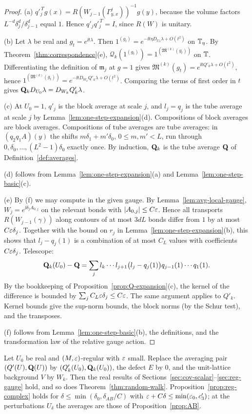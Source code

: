 \begin{proof}
(a) $q'^{\,T}_jg(x)=R(W_{j-1}(\Gamma^j_{y,x}))^{-1}g(y)$, because the volume factors $L^{-d}\delta_j^d/\delta_{j-1}^d$ equal $1$. Hence $q'_jq'^{\,T}_j=I$, since $R(W)$ is unitary.

(b) Let $\lambda$ be real and $g_t=e^{\ii t\lambda}$. Then $1^{(g_t)}=e^{-\ii t\eta D_{U_0}\lambda+O(t^2)}$ on $\mathbb T_\eta$. By Theorem~\ref{thm:correspondence}(e), $\mathcal Q_k(1^{(g_t)})=1^{(\mathfrak M^{(k)}(g_t))}$ on $\mathbb T$. Differentiating the definition of $\mathfrak m_j$ at $g=1$ gives $\mathfrak M^{(k)}(g_t)=e^{\ii tQ'_k\lambda+O(t^2)}$, hence $1^{(\mathfrak M^{(k)}(g_t))}=e^{-\ii tD_{W_k}Q'_k\lambda+O(t^2)}$. Comparing the terms of first order in $t$ gives $\mathbf Q_kD_{U_0}\lambda=D_{W_k}Q'_k\lambda$.

(c) At $U_0=1$, $q'_j$ is the block average at scale $j$, and $l_j=q_j$ is the tube average at scale $j$ by Lemma~\ref{lem:one-step-expansion}(d). Compositions of block averages are block averages. Compositions of tube averages are tube averages: in $(q_2q_1A)(y)$ the shifts $m\delta_1+m'\delta_0$, $0\le m,m'<L$, run through $0,\delta_0,\dots,(L^2-1)\delta_0$ exactly once. By induction, $\mathbf Q_k$ is the tube average $\mathbf Q$ of Definition~\ref{def:averages}.

(d) follows from Lemma~\ref{lem:one-step-expansion}(a) and Lemma~\ref{lem:one-step-basic}(c).

(e) By (f) we may compute in the given gauge. By Lemma~\ref{lem:avg-local-gauge}, $W_{j}=e^{\ii\delta_jA_{0,j}}$ on the relevant bonds with $|A_{0,j}|\le C\varepsilon$. Hence all transports $R(W_{j-1}(\gamma))$ along contours of at most $3dL$ bonds differ from $1$ by at most $C\varepsilon\delta_j$. Together with the bound on $r_j$ in Lemma~\ref{lem:one-step-expansion}(b), this shows that $l_j-q_j(1)$ is a combination of at most $C_L$ values with coefficients $C\varepsilon\delta_j$. Telescope:
\[
\mathbf Q_k(U_0)-\mathbf Q=\sum_jl_k\cdots l_{j+1}\big(l_j-q_j(1)\big)q_{j-1}(1)\cdots q_1(1).
\]
By the bookkeeping of Proposition~\ref{prop:Q-expansion}(c), the kernel of the difference is bounded by $\sum_jC_L\varepsilon\delta_j\le C\varepsilon$. The same argument applies to $Q'_k$. Kernel bounds give the sup-norm bounds, the block norms (by the Schur test), and the transposes.

(f) follows from Lemma~\ref{lem:one-step-basic}(b), the definitions, and the transformation law of the relative gauge action.
\end{proof}

\begin{corollary}\label{cor:parts-apply}
Let $U_0$ be real and $(M,\varepsilon)$-regular with $\varepsilon$ small. Replace the averaging pair $(Q'(U),\mathbf Q(U))$ by $(Q'_k(U_0),\mathbf Q_k(U_0))$, the defect $E$ by $0$, and the unit-lattice background $V$ by $W_k$. Then the real results of Sections~\ref{sec:cov-scalar}--\ref{sec:reg-gauge} hold, and so does Theorem~\ref{thm:random-walk}. Proposition~\ref{prop:reg-complex} holds for $\delta\le\min(\delta_0,\delta_{AB}/C)$ with $\varepsilon+C\delta\le\min(\varepsilon_0,c'_3)$; at the perturbations $U_\delta$ the averages are those of Proposition~\ref{prop:AB}.
\end{corollary}

